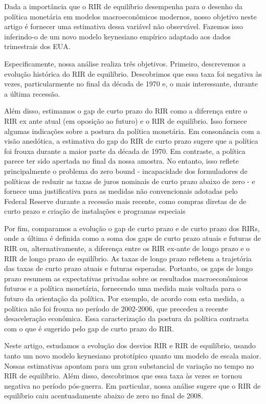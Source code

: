Dada a importância que o RIR de equilíbrio desempenha para o desenho da política monetária em modelos macroeconômicos modernos, nosso objetivo neste artigo é fornecer uma estimativa dessa variável não observável. Fazemos isso inferindo-o de um novo modelo keynesiano empírico adaptado aos dados trimestrais dos EUA. 

Especificamente, nossa análise realiza três objetivos. Primeiro, descrevemos a evolução histórica do RIR de equilíbrio. Descobrimos que essa taxa foi negativa às vezes, particularmente no final da década de 1970 e, o mais interessante, durante a última recessão.

Além disso, estimamos o gap de curto prazo do RIR como a diferença entre o RIR ex ante atual (em oposição ao futuro) e o RIR de equilíbrio. Isso fornece algumas indicações sobre a postura da política monetária. Em consonância com a visão anedótica, a estimativa do gap do RIR de curto prazo sugere que a política foi frouxa durante a maior parte da década de 1970. Em contraste, a política parece ter sido apertada no final da nossa amostra. No entanto, isso reflete principalmente o problema do zero bound - incapacidade dos formuladores de políticas de reduzir as taxas de juros nominais de curto prazo abaixo de zero - e fornece uma justificativa para as medidas não convencionais adotadas pelo Federal Reserve durante a recessão mais recente, como compras diretas de de curto prazo e criação de instalações e programas especiais

Por fim, comparamos a evolução o gap de curto prazo e de curto prazo dos RIRs, onde a última é definida como a soma dos gaps de curto prazo atuais e futuras de RIR ou, alternativamente, a diferença entre os RIR ex-ante de longo prazo e o RIR de longo prazo de equilíbrio. As taxas de longo prazo refletem a trajetória das taxas de curto prazo atuais e futuras esperadas. Portanto, os gaps de longo prazo resumem as expectativas privadas sobre os resultados macroeconômicos futuros e a política monetária, fornecendo uma medida mais voltada para o futuro da orientação da política. Por exemplo, de acordo com esta medida, a política não foi frouxa no período de 2002-2006, que precedeu a recente desaceleração econômica. Essa caracterização da postura da política contrasta com o que é sugerido pelo gap de curto prazo do RIR.

Neste artigo, estudamos a evolução dos desvios RIR e RIR de equilíbrio, usando tanto um novo modelo keynesiano prototípico quanto um modelo de escala maior. Nossas estimativas apontam para um grau substancial de variação no tempo no RIR de equilíbrio. Além disso, descobrimos que essa taxa às vezes se tornou negativa no período pós-guerra. Em particular, nossa análise sugere que o RIR de equilíbrio caiu acentuadamente abaixo de zero no final de 2008.

